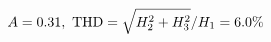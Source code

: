 \documentclass[preview]{standalone}
\begin{document}
\begin{align*}
\special{dvisvgm:raw <g id='unique000'>}A=0.31,\ \text{THD}=\sqrt{H_2^2+H_3^2}/H_1=6.0\%\special{dvisvgm:raw </g>}
\end{align*}
\end{document}
